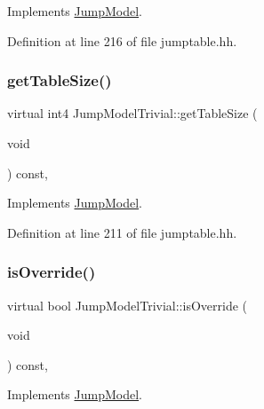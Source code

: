 Implements \mbox{\hyperlink{class_jump_model_a8c346de087366515ed90ba1d27012451}{Jump\+Model}}.



Definition at line 216 of file jumptable.\+hh.

\mbox{\label{class_jump_model_trivial_a850ec9c73e9acc78465d896008b265fe}} 
\subsubsection{\texorpdfstring{getTableSize()}{getTableSize()}}
{\footnotesize\ttfamily virtual int4 Jump\+Model\+Trivial\+::get\+Table\+Size (\begin{DoxyParamCaption}\item[{void}]{ }\end{DoxyParamCaption}) const\hspace{0.3cm}{\ttfamily [inline]}, {\ttfamily [virtual]}}



Implements \mbox{\hyperlink{class_jump_model_acbc757d5fe05e9e8cb15697ddc73f367}{Jump\+Model}}.



Definition at line 211 of file jumptable.\+hh.

\mbox{\label{class_jump_model_trivial_a30aedefb694d84c374a6dff13002cae7}} 
\subsubsection{\texorpdfstring{isOverride()}{isOverride()}}
{\footnotesize\ttfamily virtual bool Jump\+Model\+Trivial\+::is\+Override (\begin{DoxyParamCaption}\item[{void}]{ }\end{DoxyParamCaption}) const\hspace{0.3cm}{\ttfamily [inline]}, {\ttfamily [virtual]}}



Implements \mbox{\hyperlink{class_jump_model_af54c70c0bcedfcf45ed1ce6895d9e2db}{Jump\+Model}}.



